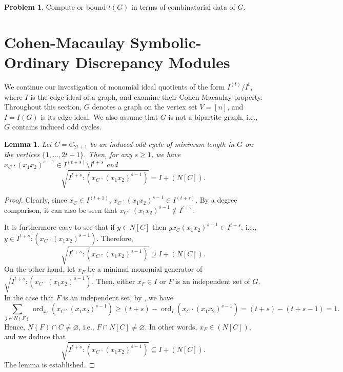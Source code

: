 \documentclass[12pt]{amsart}
\numberwithin{equation}{section}
\newtheorem{lemma}[theorem]{Lemma}
\theoremstyle{definition}
\newtheorem{prob}[theorem]{Problem}
\theoremstyle{definition}
\DeclareMathOperator{\ord}{ord}
\begin{document}
\begin{prob}
	Compute or bound $t(G)$ in terms of combinatorial data of $G$.
\end{prob}


\section{Cohen-Macaulay Symbolic-Ordinary Discrepancy Modules} \label{sec.sym/ord}

We continue our investigation of monomial ideal quotients of the form $I^{(t)}/I^t$, where $I$ is the edge ideal of a graph, and examine their Cohen-Macaulay property. Throughout this section, $G$ denotes a graph on the vertex set $V = [n]$, and $I = I(G)$ is its edge ideal. We also assume that $G$ is not a bipartite graph, i.e., $G$ contains induced odd cycles.

\begin{lemma}
	\label{lem.NC}
	Let $C = C_{2t+1}$ be an induced odd cycle of minimum length in $G$ on the vertices $\{1, \dots, 2t+1\}$. Then, for any $s \ge 1$, we have $x_C \cdot (x_1x_2)^{s-1} \in I^{(t+s)} \setminus I^{t+s}$ and 
	$$\sqrt{I^{t+s} : (x_C \cdot (x_1x_2)^{s-1})} = I + (N[C]).$$
\end{lemma}

\begin{proof}
	Clearly, since $x_C \in I^{(t+1)}$, $x_C \cdot (x_1x_2)^{s-1} \in I^{(t+s)}$. By a degree comparison, it can also be seen that $x_C \cdot (x_1x_2)^{s-1} \not\in I^{t+s}$.
	
	It is furthermore easy to see that if $y \in N[C]$ then $yx_C (x_1x_2)^{s-1} \in I^{t+s}$, i.e., $y \in I^{t+s} : (x_C \cdot (x_1x_2)^{s-1}).$ Therefore,
	$$\sqrt{I^{t+s} : (x_C \cdot (x_1x_2)^{s-1})} \supseteq I + (N[C]).$$
	On the other hand, let $x_F$ be a minimal monomial generator of $\sqrt{I^{t+s}: (x_C \cdot (x_1x_2)^{s-1})}$. Then, either $x_F \in I$ or $F$ is an independent set of $G$. In the case that $F$ is an independent set, by \cite[Lemma 2.18]{MV2023}, we have
	$$\sum_{j \in N(F)} \ord_{x_j}(x_C \cdot (x_1x_2)^{s-1}) \ge (t+s) - \ord_I (x_C \cdot (x_1x_2)^{s-1}) = (t+s) - (t+s-1) = 1.$$
	Hence, $N(F) \cap C \not= \varnothing$, i.e., $F \cap N[C] \not= \varnothing$. In other words, $x_F \in (N[C])$, and we deduce that 
	$$\sqrt{I^{t+s} : (x_C \cdot (x_1x_2)^{s-1})} \subseteq I + (N[C]).$$
	The lemma is established.
\end{proof}
\end{document}
